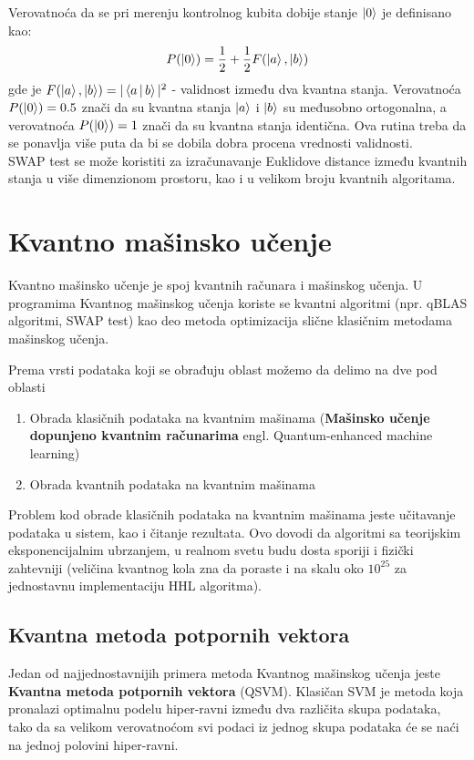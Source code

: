 \documentclass[12pt, letterpaper, oneside]{article}
\begin{document}
Verovatnoća da se pri merenju kontrolnog kubita dobije stanje $\Ket{0}$ je definisano kao:
\[
  P(\Ket{0}) = \frac{1}{2} + \frac{1}{2}F(\Ket{a},\Ket{b})  
\]
gde je $F(\Ket{a},\Ket{b}) = |\Braket{a|b}|^2$ - validnost između dva kvantna stanja.
Verovatnoća $P(\Ket{0}) = 0.5$ znači da su kvantna stanja  $\Ket{a}$ i $\Ket{b}$ su međusobno ortogonalna, 
a verovatnoća $P(\Ket{0}) = 1$ znači da su kvantna stanja identična. Ova rutina treba da se ponavlja više puta da bi se dobila dobra procena vrednosti validnosti. \\
SWAP test se može koristiti za izračunavanje Euklidove distance između kvantnih stanja u više dimenzionom prostoru, kao i u velikom broju kvantnih algoritama.

\newpage
\section{Kvantno mašinsko učenje}
Kvantno mašinsko učenje je spoj kvantnih računara i mašinskog učenja. U programima Kvantnog mašinskog učenja koriste se kvantni algoritmi (npr. qBLAS algoritmi, SWAP test)
kao deo metoda optimizacija slične klasičnim metodama mašinskog učenja. 

Prema vrsti podataka koji se obrađuju oblast možemo da delimo na dve pod oblasti
\begin{enumerate}
    \item Obrada klasičnih podataka na kvantnim mašinama (\textbf{Mašinsko učenje dopunjeno kvantnim računarima} engl. Quantum-enhanced machine learning)
    \item Obrada kvantnih podataka na kvantnim mašinama
\end{enumerate}
Problem kod obrade klasičnih podataka na kvantnim mašinama jeste učitavanje podataka u sistem, kao i čitanje rezultata. Ovo dovodi da algoritmi sa teorijskim eksponencijalnim
ubrzanjem, u realnom svetu budu dosta sporiji i fizički zahtevniji (veličina kvantnog kola zna da poraste i na skalu oko $10^{25}$ za jednostavnu implementaciju HHL algoritma). \cite{Quantum_machine_learning}

\subsection{Kvantna metoda potpornih vektora}
Jedan od najjednostavnijih primera metoda Kvantnog mašinskog učenja jeste \textbf{Kvantna metoda potpornih vektora} (QSVM). Klasičan SVM je metoda koja pronalazi optimalnu podelu hiper-ravni
između dva različita skupa podataka, tako da sa velikom verovatnoćom svi podaci iz jednog skupa podataka će se naći na jednoj polovini hiper-ravni. \cite{Quantum_machine_learning}
\end{document}
